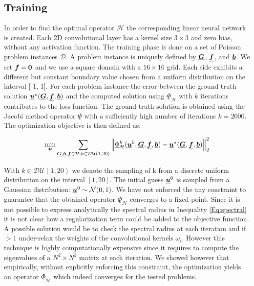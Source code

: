\subsection{Training}
In order to find the optimal operator $\mathcal{H}$ the corresponding linear neural network is created. Each 2D convolutional layer has a kernel size $3\times 3$ and zero bias, without any activation function. The training phase is done on a set of Poisson problem instances $\mathcal{D}$. A problem instance is uniquely defined by $\underline{{\bm{G}}}$, $\underline{{\bm{f}}}$, and $\underline{{\bm{b}}}$.
We set ${\bm{f}}=\bold{0}$ and we use a square domain with a $16\times16$ grid. Each side exhibits a different but constant boundary value chosen from a uniform distribution on the interval [-1, 1]. For each problem instance the error between the ground truth solution $\underline{{\bm{u}}} ^ {\star}(\underline{{\bm{G}}}, \underline{{\bm{f}}}, \underline{{\bm{b}}})$ and the computed solution using $\underline{\Phi}_{\mathcal{H}}$ with $k$ iterations contributes to the loss function. The ground truth solution is obtained using the Jacobi method operator $\underline{\Psi}$ with a sufficiently high number of iterations $k=2000$.
The optimization objective is then defined as:



\begin{align}
    \underset{\mathcal{H}}{\text{min}} \sum_{\underline{{\bm{G}}},\underline{{\bm{b}}},\underline{{\bm{f}}} \in \mathcal{D}; k \in \mathcal{DU}(1, 20)} \left \Vert \underline{\Phi}_{\mathcal{H}}^k (\underline{{\bm{u}}}^0, \underline{{\bm{G}}}, \underline{{\bm{f}}}, \underline{{\bm{b}}}) - \underline{{\bm{u}}} ^ {\star}(\underline{{\bm{G}}}, \underline{{\bm{f}}}, \underline{{\bm{b}}}) \right \Vert _2 ^ 2
\end{align}

With $k \in \mathcal{DU}(1, 20)$ we denote the sampling of k from a discrete uniform distribution on the interval $[1, 20]$. The initial guess $\underline{{\bm{u}}}^0$ is sampled from a Gaussian distribution: $\underline{{\bm{u}}}^0 \sim \mathcal{N}(0, 1)$. We have not enforced the any constraint to guarantee that the obtained operator $\underline{\Phi}_{\mathcal{H}}$ converges to a fixed point. Since it is not possible to express analytically the spectral radius in Inequality \ref{Eq:spectral} it is not clear how a regularization term could be added to the objective function.
A possible solution would be to check the spectral radius at each iteration and if $>1$ under-relax the weights of the convolutional kernels $\omega_i$.
However this technique is highly computationally expensive since it requires to compute the eigenvalues of a $N^2\times N^2$ matrix at each iteration. 
We showed however that empirically, without explicitly enforcing this constraint, the optimization yields an operator $\underline{\Phi}_{\mathcal{H}}$ which indeed converges for the tested problems.



